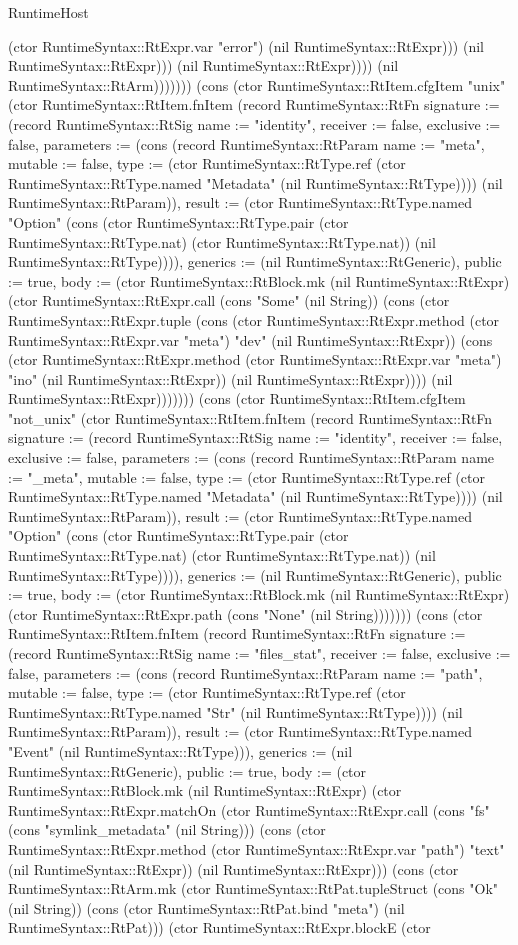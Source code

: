 \begin{lexlean}{RuntimeHost}
\begin{semanticmodule}
{(ctor RuntimeSyntax::RtExpr.var "error") (nil RuntimeSyntax::RtExpr))) (nil RuntimeSyntax::RtExpr))) (nil RuntimeSyntax::RtExpr)))) (nil RuntimeSyntax::RtArm)))))})) (cons (ctor RuntimeSyntax::RtItem.cfgItem "unix" (ctor RuntimeSyntax::RtItem.fnItem (record RuntimeSyntax::RtFn {signature := (record RuntimeSyntax::RtSig {name := "identity", receiver := false, exclusive := false, parameters := (cons (record RuntimeSyntax::RtParam {name := "meta", mutable := false, type := (ctor RuntimeSyntax::RtType.ref (ctor RuntimeSyntax::RtType.named "Metadata" (nil RuntimeSyntax::RtType)))}) (nil RuntimeSyntax::RtParam)), result := (ctor RuntimeSyntax::RtType.named "Option" (cons (ctor RuntimeSyntax::RtType.pair (ctor RuntimeSyntax::RtType.nat) (ctor RuntimeSyntax::RtType.nat)) (nil RuntimeSyntax::RtType)))}), generics := (nil RuntimeSyntax::RtGeneric), public := true, body := (ctor RuntimeSyntax::RtBlock.mk (nil RuntimeSyntax::RtExpr) (ctor RuntimeSyntax::RtExpr.call (cons "Some" (nil String)) (cons (ctor RuntimeSyntax::RtExpr.tuple (cons (ctor RuntimeSyntax::RtExpr.method (ctor RuntimeSyntax::RtExpr.var "meta") "dev" (nil RuntimeSyntax::RtExpr)) (cons (ctor RuntimeSyntax::RtExpr.method (ctor RuntimeSyntax::RtExpr.var "meta") "ino" (nil RuntimeSyntax::RtExpr)) (nil RuntimeSyntax::RtExpr)))) (nil RuntimeSyntax::RtExpr))))}))) (cons (ctor RuntimeSyntax::RtItem.cfgItem "not_unix" (ctor RuntimeSyntax::RtItem.fnItem (record RuntimeSyntax::RtFn {signature := (record RuntimeSyntax::RtSig {name := "identity", receiver := false, exclusive := false, parameters := (cons (record RuntimeSyntax::RtParam {name := "_meta", mutable := false, type := (ctor RuntimeSyntax::RtType.ref (ctor RuntimeSyntax::RtType.named "Metadata" (nil RuntimeSyntax::RtType)))}) (nil RuntimeSyntax::RtParam)), result := (ctor RuntimeSyntax::RtType.named "Option" (cons (ctor RuntimeSyntax::RtType.pair (ctor RuntimeSyntax::RtType.nat) (ctor RuntimeSyntax::RtType.nat)) (nil RuntimeSyntax::RtType)))}), generics := (nil RuntimeSyntax::RtGeneric), public := true, body := (ctor RuntimeSyntax::RtBlock.mk (nil RuntimeSyntax::RtExpr) (ctor RuntimeSyntax::RtExpr.path (cons "None" (nil String))))}))) (cons (ctor RuntimeSyntax::RtItem.fnItem (record RuntimeSyntax::RtFn {signature := (record RuntimeSyntax::RtSig {name := "files_stat", receiver := false, exclusive := false, parameters := (cons (record RuntimeSyntax::RtParam {name := "path", mutable := false, type := (ctor RuntimeSyntax::RtType.ref (ctor RuntimeSyntax::RtType.named "Str" (nil RuntimeSyntax::RtType)))}) (nil RuntimeSyntax::RtParam)), result := (ctor RuntimeSyntax::RtType.named "Event" (nil RuntimeSyntax::RtType))}), generics := (nil RuntimeSyntax::RtGeneric), public := true, body := (ctor RuntimeSyntax::RtBlock.mk (nil RuntimeSyntax::RtExpr) (ctor RuntimeSyntax::RtExpr.matchOn (ctor RuntimeSyntax::RtExpr.call (cons "fs" (cons "symlink_metadata" (nil String))) (cons (ctor RuntimeSyntax::RtExpr.method (ctor RuntimeSyntax::RtExpr.var "path") "text" (nil RuntimeSyntax::RtExpr)) (nil RuntimeSyntax::RtExpr))) (cons (ctor RuntimeSyntax::RtArm.mk (ctor RuntimeSyntax::RtPat.tupleStruct (cons "Ok" (nil String)) (cons (ctor RuntimeSyntax::RtPat.bind "meta") (nil RuntimeSyntax::RtPat))) (ctor RuntimeSyntax::RtExpr.blockE (ctor }
\end{semanticmodule}
\end{lexlean}
